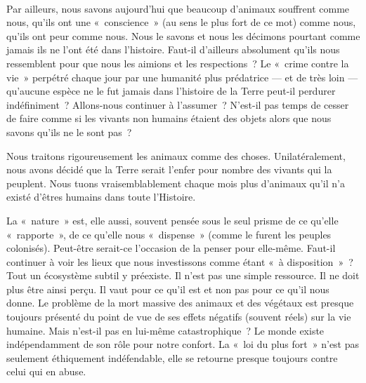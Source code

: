 {\vspace*{12pt}\\
Par ailleurs, nous savons aujourd'hui que beaucoup d'animaux souffrent comme nous, qu'ils ont une «~conscience~» (au sens le plus fort de ce mot) comme nous, qu'ils ont peur comme nous. Nous le savons et nous les décimons pourtant comme jamais ils ne l'ont été dans l'histoire. Faut-il d'ailleurs absolument qu'ils nous ressemblent pour que nous les aimions et les respections~? Le «~crime contre la vie~» perpétré chaque jour par une humanité plus prédatrice — et de très loin — qu'aucune espèce ne le fut jamais dans l'histoire de la Terre peut-il perdurer indéfiniment~? Allons-nous continuer à l'assumer~? N'est-il pas temps de cesser de faire comme si les vivants non humains étaient des objets alors que nous savons qu'ils ne le sont pas~?

Nous traitons rigoureusement les animaux comme des choses. Unilatéralement, nous avons décidé que la Terre serait l'enfer pour nombre des vivants qui la peuplent. Nous tuons vraisemblablement chaque mois plus d'animaux qu'il n'a existé d'êtres humains dans toute l'Histoire.

La «~nature~» est, elle aussi, souvent pensée sous le seul prisme de ce qu'elle «~rapporte~», de ce qu'elle nous «~dispense~» (comme le furent les peuples colonisés). Peut-être serait-ce l'occasion de la penser pour elle-même. Faut-il continuer à voir les lieux que nous investissons comme étant «~à disposition~»~? Tout un écosystème subtil y préexiste. Il n'est pas une simple ressource. Il ne doit plus être ainsi perçu. Il vaut pour ce qu'il est et non pas pour ce qu'il nous donne. Le problème de la mort massive des animaux et des végétaux est presque toujours présenté du point de vue de ses effets négatifs (souvent réels) sur la vie humaine. Mais n'est-il pas en lui-même catastrophique~? Le monde existe indépendamment de son rôle pour notre confort. La «~loi du plus fort~» n'est pas seulement éthiquement indéfendable, elle se retourne presque toujours contre celui qui en abuse.

}
